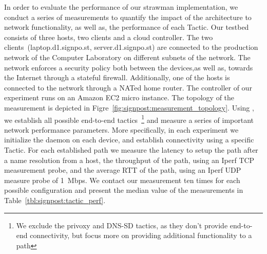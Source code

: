 In order to evaluate the performance of our strawman implementation, we conduct
a series of measurements to quantify the impact of the architecture to network
functionality, as well as, the performance of each Tactic.  Our testbed consists
of three hosts, two clients and a cloud controller. The two \signpost
clients~(laptop.d1.signpo.st, server.d1.signpo.st)
are connected to the production network of the Computer Laboratory on different
subnets of the network. The network enforces a security policy both between the
devices,as well as, towards the Internet through a stateful firewall.
Additionally, one of the hosts is connected to the network through a NATed 
home router. The \signpost controller of our experiment runs on an
Amazon EC2 micro instance. The topology of the measurement is depicted in
Figre~\ref{fig:signpost:measurement_topology}. Using \signpost, we establish all possible end-to-end
tactics~\footnote{We exclude the privoxy and DNS-SD tactics, as they don't
  provide end-to-end connectivity, but focus more on providing additional
  functionality to a path} and measure a series of important network performance
parameters.  More specifically, in each experiment we initialize the \signpost
daemon on each device, and establish connectivity using a specific Tactic. For
each established path we measure the latency to setup the path after a name
resolution from a host, the throughput of the path, using an Iperf
TCP measurement probe, and the average RTT of the path, using an Iperf UDP
measure probe  of 1~Mbps. We contact our measurement ten times for each possible
configuration and present the median value of the measurements in
Table~\ref{tbl:signpost:tactic_perf}. 

